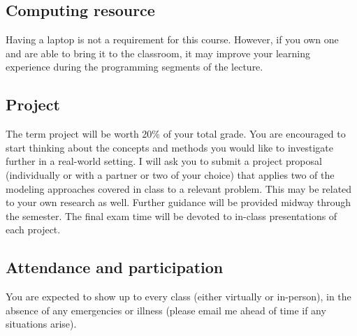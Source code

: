 \documentclass[11pt,twoside]{article}
\numberwithin{equation}{section}
\newcommand{\?}{\stackrel{?}{=}}
\begin{document}
\subsection{Computing resource}
Having a laptop is not a requirement for this course.
However, if you own one and are able to bring it to the classroom, it may improve your learning experience during the programming segments of the lecture.

\subsection{Project}
The term project will be worth 20\% of your total grade.  You are encouraged to start thinking about the concepts and
methods you would like to investigate further in a real-world setting.   I will ask you to submit a
project proposal (individually or with a partner or two of your choice) that applies two of the modeling approaches covered in class to a relevant problem.  This may be related to your own research as well.   Further guidance will be provided midway through the
semester.  The final exam time will be devoted to in-class presentations of each project. 

\subsection{Attendance and participation}
You are expected to show up to every class (either virtually or in-person), in the absence of any emergencies or illness (please email me ahead of time if any situations arise).
\end{document}
